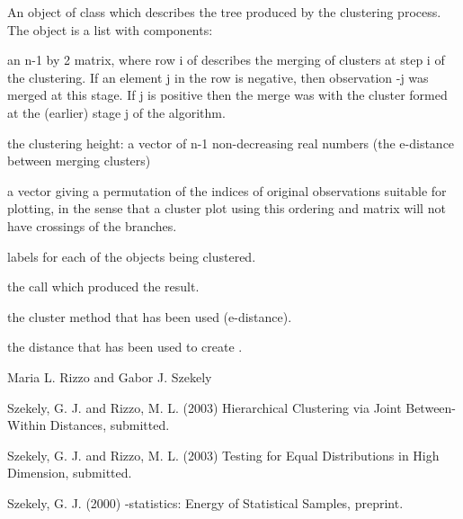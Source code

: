 \documentclass{article}
\begin{document}
\begin{Value}
An object of class  which describes the tree produced by
the clustering process. The object is a list with components: 
\begin{ldescription}
\item[\code{merge:}] an n-1 by 2 matrix, where row i of  describes the
merging of clusters at step i of the clustering. If an element j in the
row is negative, then observation -j was merged at this
stage. If j is positive then the merge was with the cluster
formed at the (earlier) stage j of the algorithm.
\item[\code{height:}] the clustering height: a vector of n-1 non-decreasing
real numbers (the e-distance between merging clusters)
\item[\code{order:}] a vector giving a permutation of the indices of 
original observations suitable for plotting, in the sense that a 
cluster plot using this ordering and matrix  will not have 
crossings of the branches.
\item[\code{labels:}] labels for each of the objects being clustered.
\item[\code{call:}] the call which produced the result.
\item[\code{method:}] the cluster method that has been used (e-distance).
\item[\code{dist.method:}] the distance that has been used to create .
\end{ldescription}
\end{Value}
\begin{Author}\relax
Maria L. Rizzo  and
Gabor J. Szekely 
\end{Author}
\begin{References}\relax
Szekely, G. J. and Rizzo, M. L. (2003) Hierarchical Clustering
via Joint Between-Within Distances, submitted.

Szekely, G. J. and Rizzo, M. L. (2003) Testing for Equal
Distributions in High Dimension, submitted.

Szekely, G. J. (2000) -statistics: Energy of
Statistical Samples, preprint.\end{References}
\begin{SeeAlso}\relax
{}  
\end{SeeAlso}
\end{document}
